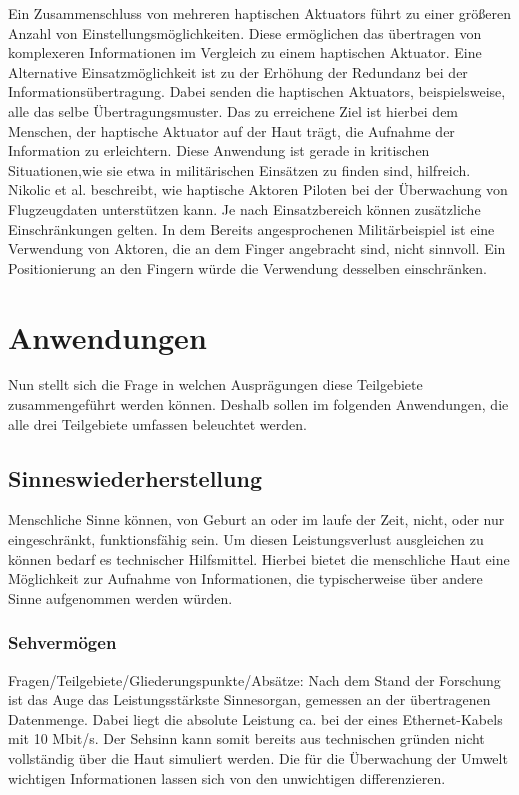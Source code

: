 \documentclass{llncs}					%
\begin{document}
Ein Zusammenschluss von mehreren haptischen \glspl{Aktuator} führt zu einer größeren Anzahl von Einstellungsmöglichkeiten. Diese ermöglichen das übertragen von komplexeren Informationen im Vergleich zu einem haptischen \gls{Aktuator}. Eine Alternative Einsatzmöglichkeit ist zu der Erhöhung der Redundanz bei der Informationsübertragung. Dabei senden die haptischen \glspl{Aktuator}, beispielsweise, alle das selbe Übertragungsmuster. Das zu erreichene Ziel ist hierbei dem Menschen, der haptische \gls{Aktuator} auf der Haut trägt, die Aufnahme der Information zu erleichtern. Diese Anwendung ist gerade in kritischen Situationen,wie sie etwa in militärischen Einsätzen zu finden sind, hilfreich\cite{nikolic1998multisensory}. Nikolic et al. \cite{nikolic1998multisensory} beschreibt, wie haptische Aktoren Piloten bei der Überwachung von Flugzeugdaten unterstützen kann.
Je nach Einsatzbereich können zusätzliche Einschränkungen gelten. In dem Bereits angesprochenen Militärbeispiel ist eine Verwendung von Aktoren, die an dem Finger angebracht sind, nicht sinnvoll. Ein Positionierung an den Fingern würde die Verwendung desselben einschränken.

\newpage
\section{Anwendungen}
Nun stellt sich die Frage in welchen Ausprägungen diese Teilgebiete zusammengeführt werden können. Deshalb sollen im folgenden Anwendungen, die alle drei Teilgebiete umfassen beleuchtet werden.

\subsection{Sinneswiederherstellung}
Menschliche Sinne können, von Geburt an oder im laufe der Zeit, nicht, oder nur eingeschränkt, funktionsfähig sein. Um diesen Leistungsverlust ausgleichen zu können bedarf es technischer Hilfsmittel. Hierbei bietet die menschliche Haut eine Möglichkeit zur Aufnahme von Informationen, die typischerweise über andere Sinne aufgenommen werden würden.

\subsubsection{Sehvermögen}
Fragen/Teilgebiete/Gliederungspunkte/Absätze:
Nach dem Stand der Forschung ist das Auge das Leistungsstärkste Sinnesorgan, gemessen an der übertragenen Datenmenge\cite{Koch2006}. Dabei liegt die absolute Leistung ca. bei der eines Ethernet-Kabels mit 10 Mbit/s\cite{Koch2006}. Der Sehsinn kann somit bereits aus technischen gründen nicht vollständig über die Haut simuliert werden.
Die für die Überwachung der Umwelt wichtigen Informationen lassen sich von den unwichtigen differenzieren.
\end{document}
